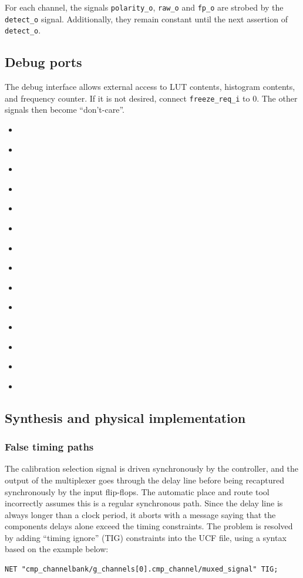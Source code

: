 \documentclass[a4paper,11pt]{article}
\begin{document}
For each channel, the signals \verb!polarity_o!, \verb!raw_o! and \verb!fp_o! are strobed by the \verb!detect_o! signal. Additionally, they remain constant until the next assertion of \verb!detect_o!.

\subsection{Debug ports}
The debug interface allows external access to LUT contents, histogram contents, and frequency counter. If it is not desired, connect \verb!freeze_req_i! to 0. The other signals then become ``don't-care''.
\begin{itemize}
\item \verb!!
\item \verb!!
\item \verb!!
\item \verb!!
\item \verb!!
\item \verb!!
\item \verb!!
\item \verb!!
\item \verb!!
\item \verb!!
\item \verb!!
\item \verb!!
\item \verb!!
\item \verb!!
\end{itemize}

\subsection{Synthesis and physical implementation}
\subsubsection{False timing paths}
The calibration selection signal is driven synchronously by the controller, and the output of the multiplexer goes through the delay line before being recaptured synchronously by the input flip-flops. The automatic place and route tool incorrectly assumes this is a regular synchronous path. Since the delay line is always longer than a clock period, it aborts with a message saying that the components delays alone exceed the timing constraints. The problem is resolved by adding ``timing ignore'' (TIG) constraints into the UCF file, using a syntax based on the example below:
\begin{verbatim}
NET "cmp_channelbank/g_channels[0].cmp_channel/muxed_signal" TIG;
\end{verbatim}
\end{document}
